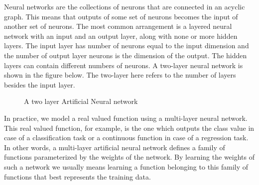 Neural networks are the collections of neurons that are connected in an acyclic 
graph. This means that outputs of some set of neurons becomes the input of 
another set of neurons. The most common arrangement is a layered neural network 
with an input and an output layer, along with none or more hidden layers. 
The input layer has number of neurons equal to the input dimension and the 
number of output layer neurons is the dimension of the output. The hidden 
layers can contain different numbers of neurons. A two-layer neural network is 
shown in the figure below. The two-layer here refers to the number of layers 
besides the input layer.
\begin{figure}[H]
\caption{A two layer Artificial Neural network}
\end{figure}

In practice, we model a real valued function using a multi-layer neural 
network. This real valued function, for example, is the one which outputs the 
class value in case of a classification task or a continuous function in case 
of a regression task. In other words, a multi-layer artificial neural 
network defines a family of functions parameterized by the weights of the 
network. By learning the weights of such a network we usually means learning a 
function belonging to this family of functions that best represents the training 
data.

